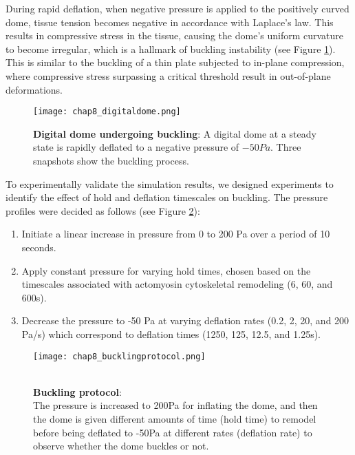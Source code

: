 During rapid deflation, when negative pressure is applied to the positively curved dome, tissue tension becomes negative in accordance with Laplace's law. This results in compressive stress in the tissue, causing the dome's uniform curvature to become irregular, which is a hallmark of buckling instability (see Figure \ref{fig_8_1}). This is similar to the buckling of a thin plate subjected to in-plane compression, where compressive stress surpassing a critical threshold result in out-of-plane deformations. 

\begin{figure}
	\centering
	\texttt{[image: chap8\_digitaldome.png]}
	\caption{\label{fig_8_1} \textbf{Digital dome undergoing buckling}: A digital dome at a steady state is rapidly deflated to a negative pressure of $-50Pa$. Three snapshots show the buckling process.
	}
\end{figure}

\vspace{2em}

To experimentally validate the simulation results, we designed experiments to identify the effect of hold and deflation timescales on buckling.  The pressure profiles were decided as follows (see Figure \ref{fig_8_2}):

\begin{enumerate}
	\item Initiate a linear increase in pressure from 0 to 200 Pa over a period of 10 seconds.
	\item Apply constant pressure for varying hold times, chosen based on the timescales associated with actomyosin cytoskeletal remodeling (6, 60, and 600s).
	\item Decrease the pressure to -50 Pa at varying deflation rates (0.2, 2, 20, and 200 Pa/s) which correspond to deflation times (1250, 125, 12.5, and 1.25s).
\end{enumerate}

\begin{figure}
	\begin{minipage}[c]{0.6\textwidth}
		\texttt{[image: chap8\_bucklingprotocol.png]}
	\end{minipage}\hfill
	\begin{minipage}[c]{0.35\textwidth}
		\caption{\\ \textbf{Buckling protocol}:\\ The pressure is increased to 200Pa for inflating the dome, and then the dome is given different amounts of time (hold time) to remodel before being deflated to -50Pa at different rates (deflation rate) to observe whether the dome buckles or not.	} \label{fig_8_2}
	\end{minipage}
\end{figure}

